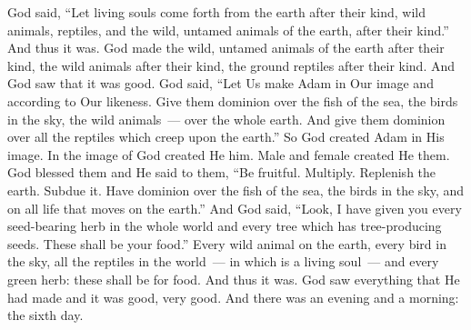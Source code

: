 \begin{inparaenum}
   God said, ``Let living souls come forth from the earth after their kind, wild animals, reptiles, and the wild, untamed animals of the earth, after their kind.'' And thus it was.%
   God made the wild, untamed animals of the earth after their kind, the wild animals after their kind, the ground reptiles after their kind. And God saw that it was good.%
   God said, ``Let Us make Adam in Our image and according to Our likeness. Give them dominion over the fish of the sea, the birds in the sky, the wild animals~--- over the whole earth. And give them dominion over all the reptiles which creep upon the earth.''%
   So God created Adam in His image. In the image of God created He him. Male and female created He them.%
   God blessed them and He said to them, ``Be fruitful. Multiply. Replenish the earth. Subdue it. Have dominion over the fish of the sea, the birds in the sky, and on all life that moves on the earth.''%
   And God said, ``Look, I have given you every seed-bearing herb in the whole world and every tree which has tree-producing seeds. These shall be your food.''%
   Every wild animal on the earth, every bird in the sky, all the reptiles in the world~--- in which is a living soul~--- and every green herb: these shall be for food. And thus it was.%
   God saw everything that He had made and it was good, very good. And there was an evening and a morning: the sixth day.%
\end{inparaenum}
